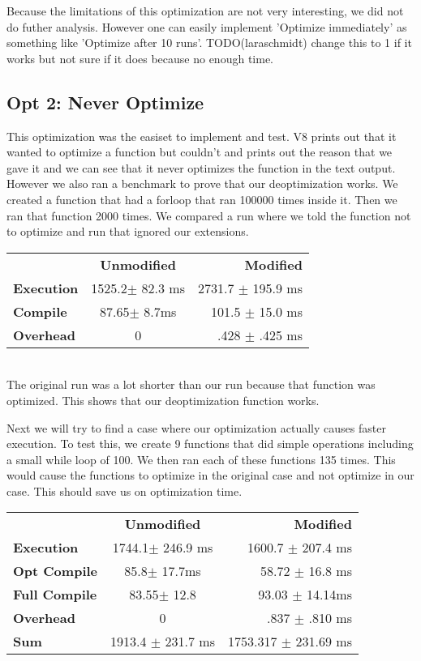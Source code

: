\documentclass[twocolumn,showpacs,%
  nofootinbib,aps,superscriptaddress,%
  eqsecnum,prd,notitlepage,showkeys,10pt]{revtex4-1}
\begin{document}
Because the limitations of this optimization are not very interesting, we did not do futher analysis. However one can easily implement 'Optimize immediately' as something like 'Optimize after 10 runs'. TODO(laraschmidt) change this to 1 if it works but not sure if it does because no enough time.

\subsection{Opt 2: Never Optimize}
This optimization was the easiset to implement and test. V8 prints out that it wanted to optimize a function but couldn't and prints out the reason that we gave it and we can see that it never optimizes the function in the text output. However we also ran a benchmark to prove that our deoptimization works. We created a function that had a forloop that ran 100000 times inside it. Then we ran that function 2000 times. We compared a run where we told the function not to optimize and run that ignored our extensions.\\ 


\begin{tabular}{ l c r }
  & \textbf{Unmodified} & \textbf{Modified} \\
\textbf{Execution} &  1525.2$\pm$ 82.3 ms &  2731.7 $\pm$ 195.9 ms \\
\textbf{Compile} & 87.65$\pm$ 8.7ms & 101.5 $\pm$ 15.0 ms \\
\textbf{Overhead} &  0   &   .428 $\pm$ .425 ms  \\
\end{tabular}\\

The original run was a lot shorter than our run because that function was optimized. This shows that our deoptimization function works.

Next we will try to find a case where our optimization actually causes faster execution. To test this, we create 9 functions that did simple operations including a small while loop of 100. We then ran each of these functions 135 times. This would cause the functions to optimize in the original case and not optimize in our case. This should save us on optimization time.\\

\begin{tabular}{ l c r }
  & \textbf{Unmodified} & \textbf{Modified} \\
\textbf{Execution} &  1744.1$\pm$ 246.9 ms &  1600.7 $\pm$ 207.4 ms \\
\textbf{Opt Compile} & 85.8$\pm$  17.7ms & 58.72 $\pm$ 16.8 ms \\
\textbf{Full Compile} &  83.55$\pm$ 12.8 & 93.03 $\pm$ 14.14ms\\ 
\textbf{Overhead} &  0   &   .837 $\pm$ .810 ms  \\
\textbf{Sum} & 1913.4 $\pm$ 231.7 ms & 1753.317 $\pm$ 231.69 ms \\

\end{tabular}\\
\end{document}
